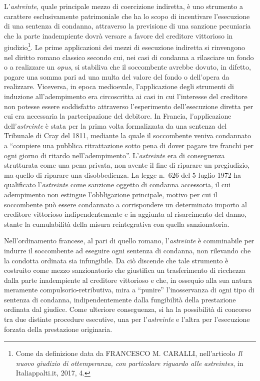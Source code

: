 \documentclass[12pt,it,a4paper,]{report}
\begin{document}
L'\emph{astreinte}, quale principale mezzo di coercizione indiretta, è
uno strumento a carattere esclusivamente patrimoniale che ha lo scopo di
incentivare l'esecuzione di una sentenza di condanna, attraverso la
previsione di una sanzione pecuniaria che la parte inadempiente dovrà
versare a favore del creditore vittorioso in giudizio\footnote{Come da
  definizione data da FRANCESCO M. CARALLI, nell'articolo \emph{Il nuovo
  giudizio di ottemperanza, con particolare riguardo alle astreintes},
  in Italiappalti.it, 2017, 4.}. Le prime applicazioni dei mezzi di
esecuzione indiretta si rinvengono nel diritto romano classico secondo
cui, nei casi di condanna a rilasciare un fondo o a realizzare un
\emph{opus}, si stabiliva che il soccombente avrebbe dovuto, in difetto,
pagare una somma pari ad una multa del valore del fondo o dell'opera da
realizzare. Viceversa, in epoca medioevale, l'applicazione degli
strumenti di induzione all'adempimento era circoscritta ai casi in cui
l'interesse del creditore non potesse essere soddisfatto attraverso
l'esperimento dell'esecuzione diretta per cui era necessaria la
partecipazione del debitore. In Francia, l'applicazione
dell'\emph{astreinte} è stata per la prima volta formalizzata da una
sentenza del Tribunale di Cray del 1811, mediante la quale il
soccombente veniva condannato a ``compiere una pubblica ritrattazione
sotto pena di dover pagare tre franchi per ogni giorno di ritardo
nell'adempimento''. L'\emph{astreinte} era di conseguenza strutturata
come una pena privata, non avente il fine di riparare un pregiudizio, ma
quello di riparare una disobbedienza. La legge n.~626 del 5 luglio 1972
ha qualificato l'\emph{astreinte} come sanzione oggetto di condanna
accessoria, il cui adempimento non estingue l'obbligazione principale,
motivo per cui il soccombente può essere condannato a corrispondere un
determinato importo al creditore vittorioso indipendentemente e in
aggiunta al risarcimento del danno, stante la cumulabilità della misura
reintegrativa con quella sanzionatoria.

Nell'ordinamento francese, al pari di quello romano, l'\emph{astreinte}
è comminabile per indurre il soccombente ad eseguire ogni sentenza di
condanna, non rilevando che la condotta ordinata sia infungibile. Da ciò
discende che tale strumento è costruito come mezzo sanzionatorio che
giustifica un trasferimento di ricchezza dalla parte inadempiente al
creditore vittorioso e che, in ossequio alla sua natura meramente
compulsorio-retributiva, mira a ``punire'' l'inosservanza di ogni tipo
di sentenza di condanna, indipendentemente dalla fungibilità della
prestazione ordinata dal giudice. Come ulteriore conseguenza, si ha la
possibilità di concorso tra due distinte procedure esecutive, una per
l'\emph{astreinte} e l'altra per l'esecuzione forzata della prestazione
originaria.
\end{document}
